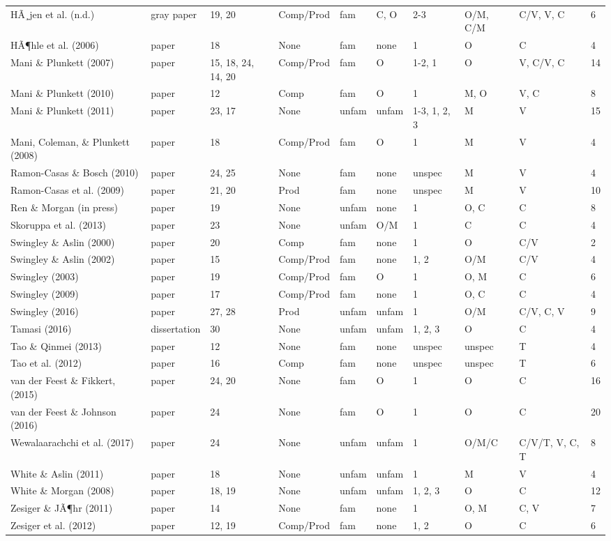 \documentclass[
  english,
  man, noextraspace]{apa6}
\newenvironment{lltable}{\begin{landscape}\begin{center}\begin{ThreePartTable}}{\end{ThreePartTable}\end{center}\end{landscape}}
\begin{document}
\begin{lltable}
{\begin{longtable}{llllllllll}
HÃ¸jen et al. (n.d.) & gray paper & 19, 20 & Comp/Prod & fam & C, O & 2-3 & O/M, C/M & C/V, V, C & 6\\
HÃ¶hle et al. (2006) & paper & 18 & None & fam & none & 1 & O & C & 4\\
Mani \& Plunkett (2007) & paper & 15, 18, 24, 14, 20 & Comp/Prod & fam & O & 1-2, 1 & O & V, C/V, C & 14\\
Mani \& Plunkett (2010) & paper & 12 & Comp & fam & O & 1 & M, O & V, C & 8\\
Mani \& Plunkett (2011) & paper & 23, 17 & None & unfam & unfam & 1-3, 1, 2, 3 & M & V & 15\\
Mani, Coleman, \& Plunkett (2008) & paper & 18 & Comp/Prod & fam & O & 1 & M & V & 4\\
Ramon-Casas \& Bosch (2010) & paper & 24, 25 & None & fam & none & unspec & M & V & 4\\
Ramon-Casas et al. (2009) & paper & 21, 20 & Prod & fam & none & unspec & M & V & 10\\
Ren \& Morgan (in press) & paper & 19 & None & unfam & none & 1 & O, C & C & 8\\
Skoruppa et al. (2013) & paper & 23 & None & unfam & O/M & 1 & C & C & 4\\
Swingley \& Aslin (2000) & paper & 20 & Comp & fam & none & 1 & O & C/V & 2\\
Swingley \& Aslin (2002) & paper & 15 & Comp/Prod & fam & none & 1, 2 & O/M & C/V & 4\\
Swingley (2003) & paper & 19 & Comp/Prod & fam & O & 1 & O, M & C & 6\\
Swingley (2009) & paper & 17 & Comp/Prod & fam & none & 1 & O, C & C & 4\\
Swingley (2016) & paper & 27, 28 & Prod & unfam & unfam & 1 & O/M & C/V, C, V & 9\\
Tamasi (2016) & dissertation & 30 & None & unfam & unfam & 1, 2, 3 & O & C & 4\\
Tao \& Qinmei (2013) & paper & 12 & None & fam & none & unspec & unspec & T & 4\\
Tao et al. (2012) & paper & 16 & Comp & fam & none & unspec & unspec & T & 6\\
van der Feest \& Fikkert, (2015) & paper & 24, 20 & None & fam & O & 1 & O & C & 16\\
van der Feest \& Johnson (2016) & paper & 24 & None & fam & O & 1 & O & C & 20\\
Wewalaarachchi et al. (2017) & paper & 24 & None & unfam & unfam & 1 & O/M/C & C/V/T, V, C, T & 8\\
White \& Aslin (2011) & paper & 18 & None & unfam & unfam & 1 & M & V & 4\\
White \& Morgan (2008) & paper & 18, 19 & None & unfam & unfam & 1, 2, 3 & O & C & 12\\
Zesiger \& JÃ¶hr (2011) & paper & 14 & None & fam & none & 1 & O, M & C, V & 7\\
Zesiger et al. (2012) & paper & 12, 19 & Comp/Prod & fam & none & 1, 2 & O & C & 6\\
\bottomrule
\end{longtable}

}
\end{lltable}
\end{document}
